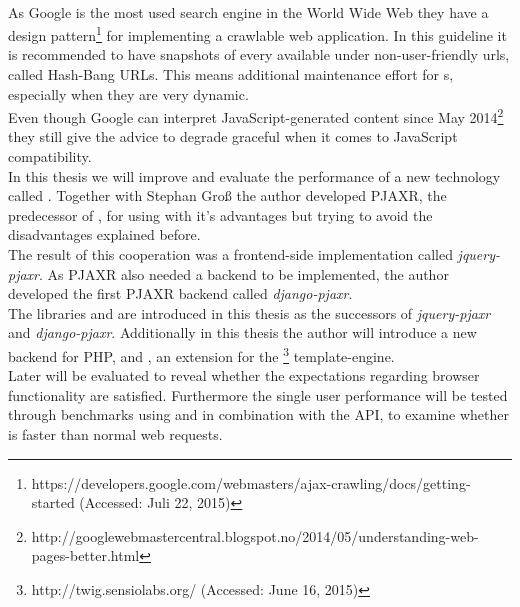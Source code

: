 \\
As Google is the most used search engine in the World Wide Web they have a design pattern\footnote{https://developers.google.com/webmasters/ajax-crawling/docs/getting-started (Accessed: Juli 22, 2015)} for implementing a crawlable \ajax{} web application.
In this guideline it is recommended to have snapshots of every \webPage{} available under non-user-friendly \gls{url}s, called Hash-Bang URLs.
This means additional maintenance effort for \webSite{}s, especially when they are very dynamic.
\\
Even though Google can interpret JavaScript-generated content since May 2014\footnote{http://googlewebmastercentral.blogspot.no/2014/05/understanding-web-pages-better.html} they still give the advice to degrade graceful when it comes to JavaScript compatibility.
\\
In this thesis we will improve and evaluate the performance of a new technology called \lare{}.
Together with Stephan Gro{\ss} the author developed PJAXR, the predecessor of \lare{}, for using \ajax{} with it's advantages but trying to avoid the disadvantages explained before.
\\
The result of this cooperation was a frontend-side implementation called \emph{jquery-pjaxr}.
As PJAXR also needed a backend to be implemented, the author developed the first PJAXR backend called \emph{django-pjaxr}.
\\
The libraries \lareJS{} and \djangoLare{} are introduced in this thesis as the successors of \emph{jquery-pjaxr} and \emph{django-pjaxr}.
Additionally in this thesis the author will introduce a new \lare{} backend for PHP, \emph{\phpLare{}} and \emph{\twigLare{}}, an extension for the \twig{}\footnote{http://twig.sensiolabs.org/ (Accessed: June 16, 2015)} template-engine.
\\
Later \lare{} will be evaluated to reveal whether the expectations regarding browser functionality are satisfied.
Furthermore the single user performance will be tested through benchmarks using \curl{} and \selenium{} in combination with the \webdriver{} API, to examine whether \lare{} is faster than normal web requests.
